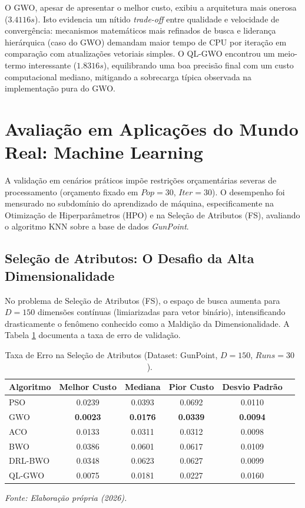 \documentclass[12pt, a4paper, oneside]{report}
\begin{document}
O GWO, apesar de apresentar o melhor custo, exibiu a arquitetura mais onerosa ($3.4116s$). Isto evidencia um nítido \textit{trade-off} entre qualidade e velocidade de convergência: mecanismos matemáticos mais refinados de busca e liderança hierárquica (caso do GWO) demandam maior tempo de CPU por iteração em comparação com atualizações vetoriais simples. O QL-GWO encontrou um meio-termo interessante ($1.8316s$), equilibrando uma boa precisão final com um custo computacional mediano, mitigando a sobrecarga típica observada na implementação pura do GWO.

\section{Avaliação em Aplicações do Mundo Real: Machine Learning}

A validação em cenários práticos impõe restrições orçamentárias severas de processamento (orçamento fixado em $Pop=30$, $Iter=30$). O desempenho foi mensurado no subdomínio do aprendizado de máquina, especificamente na Otimização de Hiperparâmetros (HPO) e na Seleção de Atributos (FS), avaliando o algoritmo KNN sobre a base de dados \textit{GunPoint}.

\subsection{Seleção de Atributos: O Desafio da Alta Dimensionalidade}

No problema de Seleção de Atributos (FS), o espaço de busca aumenta para $D=150$ dimensões contínuas (limiarizadas para vetor binário), intensificando drasticamente o fenômeno conhecido como a Maldição da Dimensionalidade. A Tabela \ref{tab:fs} documenta a taxa de erro de validação.

\begin{table}[H]
    \centering
    \caption{Taxa de Erro na Seleção de Atributos (Dataset: GunPoint, $D=150$, $Runs=30$).}
    \vspace{0.2cm}
    \begin{tabular}{lccccc}
        \toprule
        \textbf{Algoritmo} & \textbf{Melhor Custo} & \textbf{Mediana} & \textbf{Pior Custo} & \textbf{Desvio Padrão} \\
        \midrule
        PSO & 0.0239 & 0.0393 & 0.0692 & 0.0110 \\
        GWO & \textbf{0.0023} & \textbf{0.0176} & \textbf{0.0339} & \textbf{0.0094} \\
        ACO & 0.0133 & 0.0311 & 0.0312 & 0.0098 \\
        BWO & 0.0386 & 0.0601 & 0.0617 & 0.0109 \\
        DRL-BWO & 0.0348 & 0.0623 & 0.0627 & 0.0099 \\
        QL-GWO & 0.0075 & 0.0181 & 0.0227 & 0.0160 \\
        \bottomrule
    \end{tabular}
    \par\vspace{0.2cm}
    \centerline{\small \textit{Fonte: Elaboração própria (2026).}}
    \label{tab:fs}
\end{table}
\end{document}
